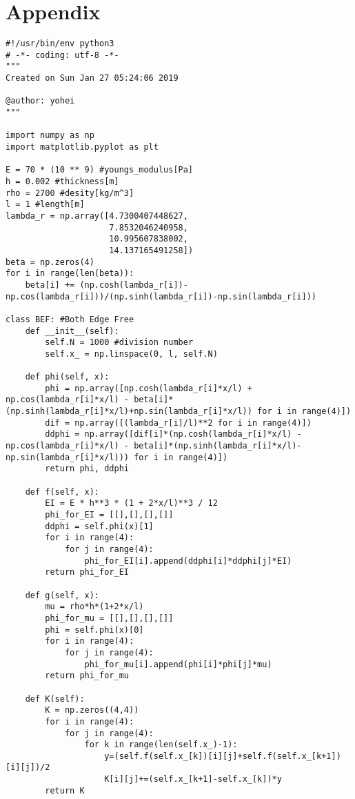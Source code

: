 \documentclass[12pt]{jsarticle}
\begin{document}
\section*{Appendix}
\begin{lstlisting}[caption=trapezoid.py,label=fuga]
#!/usr/bin/env python3
# -*- coding: utf-8 -*-
"""
Created on Sun Jan 27 05:24:06 2019

@author: yohei
"""

import numpy as np
import matplotlib.pyplot as plt

E = 70 * (10 ** 9) #youngs_modulus[Pa]
h = 0.002 #thickness[m]
rho = 2700 #desity[kg/m^3]
l = 1 #length[m]
lambda_r = np.array([4.7300407448627,
                     7.8532046240958,
                     10.995607838002,
                     14.137165491258])
beta = np.zeros(4)
for i in range(len(beta)):
    beta[i] += (np.cosh(lambda_r[i])-np.cos(lambda_r[i]))/(np.sinh(lambda_r[i])-np.sin(lambda_r[i]))
        
class BEF: #Both Edge Free  
    def __init__(self):
        self.N = 1000 #division number
        self.x_ = np.linspace(0, l, self.N)
    
    def phi(self, x):
        phi = np.array([np.cosh(lambda_r[i]*x/l) + np.cos(lambda_r[i]*x/l) - beta[i]*(np.sinh(lambda_r[i]*x/l)+np.sin(lambda_r[i]*x/l)) for i in range(4)])
        dif = np.array([(lambda_r[i]/l)**2 for i in range(4)])
        ddphi = np.array([dif[i]*(np.cosh(lambda_r[i]*x/l) - np.cos(lambda_r[i]*x/l) - beta[i]*(np.sinh(lambda_r[i]*x/l)-np.sin(lambda_r[i]*x/l))) for i in range(4)])
        return phi, ddphi
     
    def f(self, x):
        EI = E * h**3 * (1 + 2*x/l)**3 / 12
        phi_for_EI = [[],[],[],[]]
        ddphi = self.phi(x)[1]
        for i in range(4):
            for j in range(4):
                phi_for_EI[i].append(ddphi[i]*ddphi[j]*EI)
        return phi_for_EI
    
    def g(self, x):
        mu = rho*h*(1+2*x/l)
        phi_for_mu = [[],[],[],[]]
        phi = self.phi(x)[0]
        for i in range(4):
            for j in range(4):
                phi_for_mu[i].append(phi[i]*phi[j]*mu)
        return phi_for_mu
    
    def K(self):
        K = np.zeros((4,4))
        for i in range(4):
            for j in range(4):
                for k in range(len(self.x_)-1):
                    y=(self.f(self.x_[k])[i][j]+self.f(self.x_[k+1])[i][j])/2
                    K[i][j]+=(self.x_[k+1]-self.x_[k])*y
        return K
    

\end{lstlisting}
\end{document}
